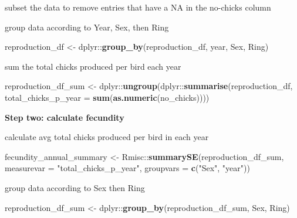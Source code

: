 \documentclass[]{article}
\newenvironment{Shaded}{\begin{snugshade}}{\end{snugshade}}
\newcommand{\KeywordTok}[1]{\textcolor[rgb]{0.13,0.29,0.53}{\textbf{{#1}}}}
\newcommand{\DataTypeTok}[1]{\textcolor[rgb]{0.13,0.29,0.53}{{#1}}}
\newcommand{\StringTok}[1]{\textcolor[rgb]{0.31,0.60,0.02}{{#1}}}
\newcommand{\NormalTok}[1]{{#1}}
\begin{document}
subset the data to remove entries that have a NA in the no-chicks column

\begin{Shaded}
\end{Shaded}

group data according to Year, Sex, then Ring

\begin{Shaded}
\begin{Highlighting}[]
\NormalTok{reproduction_df <-}\StringTok{ }\NormalTok{dplyr::}\KeywordTok{group_by}\NormalTok{(reproduction_df, year, Sex, Ring)}
\end{Highlighting}
\end{Shaded}

sum the total chicks produced per bird each year

\begin{Shaded}
\begin{Highlighting}[]
\NormalTok{reproduction_df_sum <-}\StringTok{ }
\StringTok{  }\NormalTok{dplyr::}\KeywordTok{ungroup}\NormalTok{(dplyr::}\KeywordTok{summarise}\NormalTok{(reproduction_df, }
                           \DataTypeTok{total_chicks_p_year =} \KeywordTok{sum}\NormalTok{(}\KeywordTok{as.numeric}\NormalTok{(no_chicks))))}
\end{Highlighting}
\end{Shaded}

\textbf{Step two: calculate fecundity}

calculate avg total chicks produced per bird in each year

\begin{Shaded}
\begin{Highlighting}[]
\NormalTok{fecundity_annual_summary <-}\StringTok{ }
\StringTok{  }\NormalTok{Rmisc::}\KeywordTok{summarySE}\NormalTok{(reproduction_df_sum, }\DataTypeTok{measurevar =} \StringTok{"total_chicks_p_year"}\NormalTok{, }
                   \DataTypeTok{groupvars =} \KeywordTok{c}\NormalTok{(}\StringTok{"Sex"}\NormalTok{, }\StringTok{"year"}\NormalTok{))}
\end{Highlighting}
\end{Shaded}

group data according to Sex then Ring

\begin{Shaded}
\begin{Highlighting}[]
\NormalTok{reproduction_df_sum <-}\StringTok{ }\NormalTok{dplyr::}\KeywordTok{group_by}\NormalTok{(reproduction_df_sum, Sex, Ring)}
\end{Highlighting}
\end{Shaded}
\end{document}
